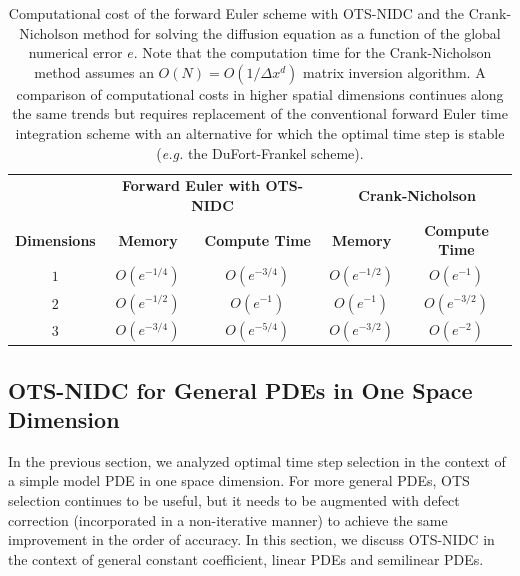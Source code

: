\documentclass[fleqn,12pt,twoside]{article}
\def\dx{\Delta x}
\def\eg{\emph{e.g. }}
\begin{document}
\begin{table}[tb]
\caption{
Computational cost of the forward Euler scheme with OTS-NIDC and
the Crank-Nicholson method for solving the diffusion equation as a function 
of the global numerical error $e$.
Note that the computation time for the Crank-Nicholson method assumes an 
$O(N) = O \left( 1/\dx^d \right)$ matrix inversion algorithm. 
A comparison of computational costs in higher spatial dimensions continues 
along the same trends but requires replacement of the conventional forward Euler
time integration scheme with an alternative for which the optimal time step is
stable (\eg the DuFort-Frankel scheme). 
}
\label{tab:comp_perf_vs_dim}
\renewcommand{\arraystretch}{1.5}
\centering
\begin{tabular}{ccccc}
  \hline
  & \multicolumn{2}{c}{\bf Forward Euler with OTS-NIDC} 
  & \multicolumn{2}{c}{\bf Crank-Nicholson} \\
  \cline{2-3} \cline{4-5} 
    {\bf Dimensions} & {\bf Memory} & {\bf Compute Time} 
  & {\bf Memory} & {\bf Compute Time} \\
  \hline 
  $1$ & $O\left( e^{-1/4} \right)$ 
      & $O\left( e^{-3/4} \right)$ 
      & $O\left( e^{-1/2} \right)$ 
      & $O\left( e^{-1} \right)$ \\ 
  $2$ & $O\left( e^{-1/2} \right)$ 
      & $O\left( e^{-1} \right)$ 
      & $O\left( e^{-1} \right)$ 
      & $O\left( e^{-3/2} \right)$ \\ 
  $3$ & $O\left( e^{-3/4} \right)$ 
      & $O\left( e^{-5/4} \right)$ 
      & $O\left( e^{-3/2} \right)$ 
      & $O\left( e^{-2} \right)$ \\
  \hline 
\end{tabular}
\end{table}


\subsection{\label{sec:ots_nidc_general_1d_pdes} 
            OTS-NIDC for General PDEs in One Space Dimension} 
In the previous section, we analyzed optimal time step selection in the 
context of a simple model PDE in one space dimension.  For more general PDEs, 
OTS selection continues to be useful, but it needs to be augmented with 
defect correction (incorporated in a non-iterative manner) to achieve 
the same improvement in the order of accuracy.  In this section, we discuss 
OTS-NIDC in the context of general constant coefficient, linear PDEs and
semilinear PDEs. 
\end{document}
